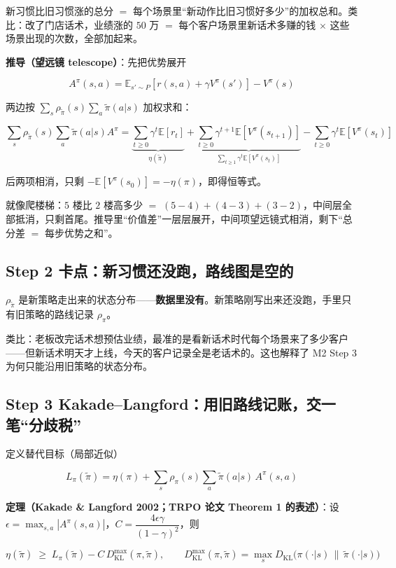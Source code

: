 \documentclass[UTF8,12pt,a4paper]{ctexrep}
\newcommand{\plain}[1]{\begin{plainbox}#1\end{plainbox}}
\begin{document}
\plain{新习惯比旧习惯涨的总分 $=$ 每个场景里``新动作比旧习惯好多少''的加权总和。类比：改了门店话术，业绩涨的 $50$ 万 $=$ 每个客户场景里新话术多赚的钱 $\times$ 这些场景出现的次数，全部加起来。}

\textbf{推导（望远镜 telescope）}：先把优势展开

$$
A^{\pi}(s,a) = \mathbb{E}_{s' \sim P}\left[r(s,a) + \gamma V^{\pi}(s')\right] - V^{\pi}(s)
$$

两边按 $\sum_s \rho_{\tilde\pi}(s)\sum_a \tilde\pi(a|s)$ 加权求和：

$$
\sum_{s}\rho_{\tilde\pi}(s)\sum_a \tilde\pi(a|s) A^\pi
= \underbrace{\sum_{t\ge0}\gamma^t \mathbb{E}[r_t]}_{\eta(\tilde\pi)}
+ \underbrace{\sum_{t\ge0}\gamma^{t+1}\mathbb{E}[V^\pi(s_{t+1})]}_{\sum_{t\ge1}\gamma^t\mathbb{E}[V^\pi(s_t)]}
- \sum_{t\ge0}\gamma^{t}\mathbb{E}[V^{\pi}(s_t)]
$$

后两项相消，只剩 $-\mathbb{E}[V^\pi(s_0)] = -\eta(\pi)$，即得恒等式。

\plain{就像爬楼梯：$5$ 楼比 $2$ 楼高多少 $=$ $(5-4)+(4-3)+(3-2)$，中间层全部抵消，只剩首尾。推导里``价值差''一层层展开，中间项望远镜式相消，剩下``总分差 $=$ 每步优势之和''。}

\subsection*{Step 2 \; 卡点：新习惯还没跑，路线图是空的}

$\rho_{\tilde\pi}$ 是新策略走出来的状态分布——\textbf{数据里没有}。新策略刚写出来还没跑，手里只有旧策略的路线记录 $\rho_\pi$。

\plain{类比：老板改完话术想预估业绩，最准的是看新话术时代每个场景来了多少客户——但新话术明天才上线，今天的客户记录全是老话术的。这也解释了 M2 Step 3 为何只能沿用旧策略的状态分布。}

\subsection*{Step 3 \; Kakade--Langford：用旧路线记账，交一笔``分歧税''}

定义替代目标（局部近似）

$$
L_\pi(\tilde\pi) = \eta(\pi) + \sum_s \rho_\pi(s)\sum_a \tilde\pi(a|s)\, A^\pi(s,a)
$$

\textbf{定理（Kakade \& Langford 2002；TRPO 论文 Theorem 1 的表述）}：设 $\epsilon = \max_{s,a}\left|A^{\pi}(s,a)\right|$，$C = \dfrac{4\epsilon\gamma}{(1-\gamma)^2}$，则

$$
\eta(\tilde\pi) \;\ge\; L_\pi(\tilde\pi) - C\, D_{\mathrm{KL}}^{\max}(\pi, \tilde\pi),
\qquad
D_{\mathrm{KL}}^{\max}(\pi,\tilde\pi) = \max_s D_{\mathrm{KL}}\big(\pi(\cdot|s)\,\|\,\tilde\pi(\cdot|s)\big)
$$
\end{document}
